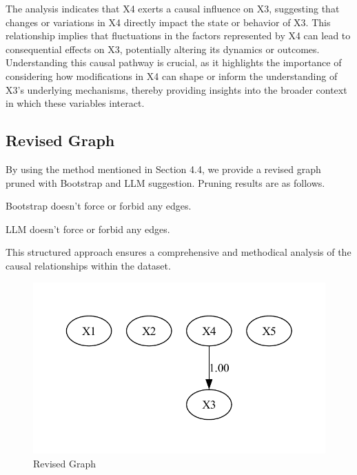 \documentclass{article}
\begin{document}
The analysis indicates that X4 exerts a causal influence on X3, suggesting that changes or variations in X4 directly impact the state or behavior of X3. This relationship implies that fluctuations in the factors represented by X4 can lead to consequential effects on X3, potentially altering its dynamics or outcomes. Understanding this causal pathway is crucial, as it highlights the importance of considering how modifications in X4 can shape or inform the understanding of X3’s underlying mechanisms, thereby providing insights into the broader context in which these variables interact.

\subsection{Revised Graph}

\begin{minipage}[t]{0.6\linewidth}
    
        By using the method mentioned in Section 4.4, we provide a revised graph pruned with Bootstrap and LLM suggestion.
        Pruning results are as follows.
        
        Bootstrap doesn't force or forbid any edges.
            
        LLM doesn't force or forbid any edges.
            
        This structured approach ensures a comprehensive and methodical analysis of the causal relationships within the dataset.
        
\vfill
\end{minipage}
\hfill
\begin{minipage}[t]{0.4\linewidth}
    \begin{figure}[H]
        \centering
        \vspace{-0.5cm}
        \includegraphics[width=\linewidth]{./demo_data/20241104_155654/Linear_Nongaussian_data/output_graph/revised_graph.pdf}
        \caption{\label{fig:corr}Revised Graph}
    \end{figure}
\end{minipage}
\end{document}
